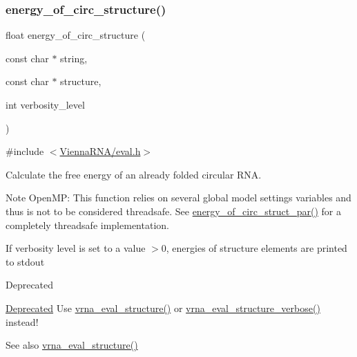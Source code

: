 \subsubsection{\texorpdfstring{energy\_of\_circ\_structure()}{energy\_of\_circ\_structure()}}
{\footnotesize\ttfamily float energy\+\_\+of\+\_\+circ\+\_\+structure (\begin{DoxyParamCaption}\item[{const char $\ast$}]{string,  }\item[{const char $\ast$}]{structure,  }\item[{int}]{verbosity\+\_\+level }\end{DoxyParamCaption})}



{\ttfamily \#include $<$\mbox{\hyperlink{eval_8h}{Vienna\+R\+N\+A/eval.\+h}}$>$}



Calculate the free energy of an already folded circular R\+NA. 

\begin{DoxyNote}{Note}
Open\+MP\+: This function relies on several global model settings variables and thus is not to be considered threadsafe. See \mbox{\hyperlink{group__eval__deprecated_ga3f01f9744ba6a40555eb4d81fc77f6df}{energy\+\_\+of\+\_\+circ\+\_\+struct\+\_\+par()}} for a completely threadsafe implementation.
\end{DoxyNote}
If verbosity level is set to a value $>$0, energies of structure elements are printed to stdout

\begin{DoxyRefDesc}{Deprecated}
\item[\mbox{\hyperlink{deprecated__deprecated000051}{Deprecated}}]Use \mbox{\hyperlink{group__eval_ga58f199f1438d794a265f3b27fc8ea631}{vrna\+\_\+eval\+\_\+structure()}} or \mbox{\hyperlink{group__eval_ga0928d699d310178f84ee2351034e5cb5}{vrna\+\_\+eval\+\_\+structure\+\_\+verbose()}} instead!\end{DoxyRefDesc}


\begin{DoxySeeAlso}{See also}
\mbox{\hyperlink{group__eval_ga58f199f1438d794a265f3b27fc8ea631}{vrna\+\_\+eval\+\_\+structure()}}
\end{DoxySeeAlso}

